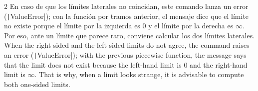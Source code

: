 \begin{paracol}{2}
En caso de que los límites laterales no coincidan, este comando lanza un error (\texttt|ValueError|); con la función por tramos anterior, el mensaje dice que el límite no existe porque el límite por la izquierda es 0 y el límite por la derecha es $\infty$. Por eso, ante un límite que parece raro, conviene calcular los dos límites laterales.
\switchcolumn
When the right-sided and the left-sided limits do not agree, the command raises an error (\texttt|ValueError|); with the previous piecewise function, the message says that the limit does not exist because the left-hand limit is 0 and the right-hand limit is $\infty$. That is why, when a limit looks strange, it is advisable to compute both one-sided limits.
\end{paracol}

